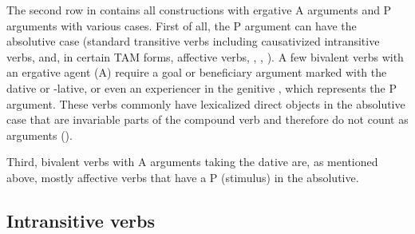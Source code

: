 The second row in  contains all constructions with ergative A arguments and P arguments with various cases. First of all, the P argument can have the absolutive case (standard transitive verbs including causativized intransitive verbs, and, in certain TAM forms, affective verbs, , , ). A few bivalent verbs with an ergative agent (A) require a goal or beneficiary argument marked with the dative or -lative, or even an experiencer in the genitive , which represents the P argument. These verbs commonly have lexicalized direct objects in the absolutive case that are invariable parts of the compound verb and therefore do not count as arguments ().

Third, bivalent verbs with A arguments taking the dative are, as mentioned above, mostly affective verbs that have a P (stimulus) in the absolutive. 



\subsection{Intransitive verbs}
\label{sec:Intransitive verbs}

